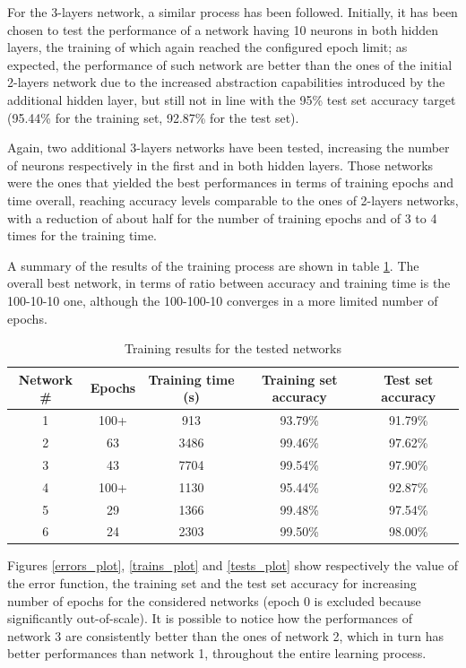 \documentclass[letterpaper,headings=standardclasses]{scrartcl}
\begin{document}
For the 3-layers network, a similar process has been followed. Initially, it has been chosen to test the performance of a network having 10 neurons in both hidden layers, the training of which again reached the configured epoch limit; as expected, the performance of such network are better than the ones of the initial 2-layers network due to the increased abstraction capabilities introduced by the additional hidden layer, but still not in line with the 95\% test set accuracy target (95.44\% for the training set, 92.87\% for the test set).

Again, two additional 3-layers networks have been tested, increasing the number of neurons respectively in the first and in both hidden layers. Those networks were the ones that yielded the best performances in terms of training epochs and time overall, reaching accuracy levels comparable to the ones of 2-layers networks, with a reduction of about half for the number of training epochs and of 3 to 4 times for the training time.

A summary of the results of the training process are shown in table \ref{net_results}. The overall best network, in terms of ratio between accuracy and training time is the 100-10-10 one, although the 100-100-10 converges in a more limited number of epochs.

\begin{table}[h]
    \centering
    \begin{tabular}{|c|c|c|c|c|}
    \hline
    Network \# & Epochs & Training time (s) & Training set accuracy & Test set accuracy \\ \hline
    1 & 100+ & 913 & 93.79\% & 91.79\% \\ \hline
    2 & 63 & 3486 & 99.46\% & 97.62\% \\ \hline
    3 & 43 & 7704 & 99.54\% & 97.90\% \\ \hline
    4 & 100+ & 1130 & 95.44\% & 92.87\% \\ \hline
    5 & 29 & 1366 & 99.48\% & 97.54\% \\ \hline
    6 & 24 & 2303 & 99.50\% & 98.00\% \\ \hline
    \end{tabular}
    \caption{Training results for the tested networks}
    \label{net_results}
\end{table}

Figures \ref{errors_plot}, \ref{trains_plot} and \ref{tests_plot} show respectively the value of the error function, the training set and the test set accuracy for increasing number of epochs for the considered networks (epoch 0 is excluded because significantly out-of-scale). It is possible to notice how the performances of network 3 are consistently better than the ones of network 2, which in turn has better performances than network 1, throughout the entire learning process.
\end{document}
